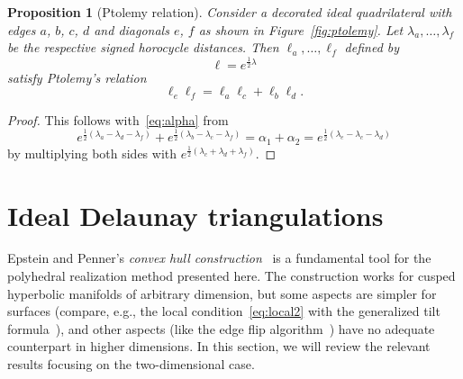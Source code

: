 \documentclass[a4paper, 11pt]{article}
\theoremstyle{plain}
\newtheorem{proposition}[theorem]{Proposition}
\theoremstyle{definition}
\begin{document}
\begin{proposition}[Ptolemy relation]
  \label{prop:ptolemy}
  Consider a decorated ideal quadrilateral with edges $a$, $b$, $c$,
  $d$ and diagonals $e$, $f$ as shown in Figure~\ref{fig:ptolemy}.
  Let $\lambda_{a},\ldots,\lambda_{f}$ be the respective signed
  horocycle distances. Then $\ell_{a},\ldots,\ell_{f}$ defined
  by 
  \begin{equation}
    \label{eq:ell}
    \ell=e^{\frac{1}{2}\lambda}
  \end{equation}
  satisfy Ptolemy's relation
  \begin{equation}
    \label{eq:ptolemy}
    \ell_{e}\ell_{f}=\ell_{a}\ell_{c}+\ell_{b}\ell_{d}.
  \end{equation}
\end{proposition}
\begin{proof}
  This follows with~\eqref{eq:alpha} from
  \begin{equation*}
    e^{\frac{1}{2}(\lambda_{a}-\lambda_{d}-\lambda_{f})}
    +e^{\frac{1}{2}(\lambda_{b}-\lambda_{c}-\lambda_{f})}
    =\alpha_{1}+\alpha_{2}
    =e^{\frac{1}{2}(\lambda_{e}-\lambda_{c}-\lambda_{d})}
  \end{equation*}
  by multiplying both sides with
  $e^{\frac{1}{2}(\lambda_{c}+\lambda_{d}+\lambda_{f})}$.
\end{proof}

\section{Ideal Delaunay triangulations}
\label{sec:delaunay}

Epstein and Penner's \emph{convex hull
  construction}~\cite{epstein88,penner87,penner12} is a fundamental
tool for the polyhedral realization method presented here. The
construction works for cusped hyperbolic manifolds of arbitrary
dimension, but some aspects are simpler for surfaces (compare, e.g.,
the local condition~\eqref{eq:local2} with the generalized tilt
formula~\cite{sakuma95}), and other aspects (like the edge flip
algorithm~\cite{weeks93}) have no adequate counterpart in higher
dimensions. In this section, we will review the relevant results
focusing on the two-dimensional case.
\end{document}
